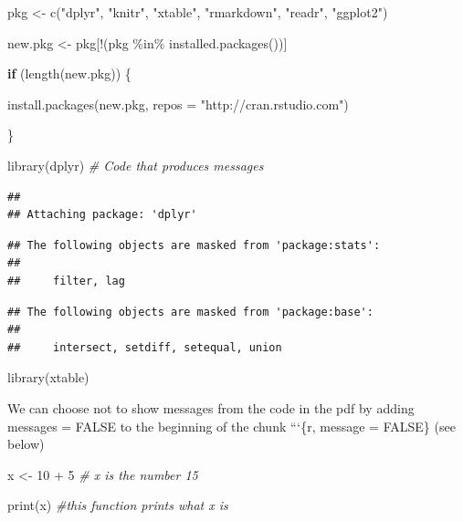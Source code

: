 \documentclass[
]{article}
\newenvironment{Shaded}{\begin{snugshade}}{\end{snugshade}}
\newcommand{\AttributeTok}[1]{\textcolor[rgb]{0.77,0.63,0.00}{#1}}
\newcommand{\CommentTok}[1]{\textcolor[rgb]{0.56,0.35,0.01}{\textit{#1}}}
\newcommand{\ControlFlowTok}[1]{\textcolor[rgb]{0.13,0.29,0.53}{\textbf{#1}}}
\newcommand{\DecValTok}[1]{\textcolor[rgb]{0.00,0.00,0.81}{#1}}
\newcommand{\FunctionTok}[1]{\textcolor[rgb]{0.00,0.00,0.00}{#1}}
\newcommand{\NormalTok}[1]{#1}
\newcommand{\OtherTok}[1]{\textcolor[rgb]{0.56,0.35,0.01}{#1}}
\newcommand{\SpecialCharTok}[1]{\textcolor[rgb]{0.00,0.00,0.00}{#1}}
\newcommand{\StringTok}[1]{\textcolor[rgb]{0.31,0.60,0.02}{#1}}
\begin{document}
\begin{Shaded}
\begin{Highlighting}[]
\NormalTok{pkg }\OtherTok{\textless{}{-}} \FunctionTok{c}\NormalTok{(}\StringTok{"dplyr"}\NormalTok{, }\StringTok{"knitr"}\NormalTok{, }\StringTok{"xtable"}\NormalTok{, }\StringTok{"rmarkdown"}\NormalTok{, }\StringTok{"readr"}\NormalTok{, }\StringTok{"ggplot2"}\NormalTok{)}

\NormalTok{new.pkg }\OtherTok{\textless{}{-}}\NormalTok{ pkg[}\SpecialCharTok{!}\NormalTok{(pkg }\SpecialCharTok{\%in\%} \FunctionTok{installed.packages}\NormalTok{())]}

\ControlFlowTok{if}\NormalTok{ (}\FunctionTok{length}\NormalTok{(new.pkg)) \{}

  \FunctionTok{install.packages}\NormalTok{(new.pkg, }\AttributeTok{repos =} \StringTok{"http://cran.rstudio.com"}\NormalTok{)}
  
\NormalTok{\}}

\FunctionTok{library}\NormalTok{(dplyr) }\CommentTok{\# Code that produces messages}
\end{Highlighting}
\end{Shaded}

\begin{verbatim}
## 
## Attaching package: 'dplyr'
\end{verbatim}

\begin{verbatim}
## The following objects are masked from 'package:stats':
## 
##     filter, lag
\end{verbatim}

\begin{verbatim}
## The following objects are masked from 'package:base':
## 
##     intersect, setdiff, setequal, union
\end{verbatim}

\begin{Shaded}
\begin{Highlighting}[]
\FunctionTok{library}\NormalTok{(xtable)}
\end{Highlighting}
\end{Shaded}

We can choose not to show messages from the code in the pdf by adding
messages = FALSE to the beginning of the chunk ```\{r, message = FALSE\}
(see below)

\begin{Shaded}
\begin{Highlighting}[]
\NormalTok{x }\OtherTok{\textless{}{-}} \DecValTok{10} \SpecialCharTok{+} \DecValTok{5} \CommentTok{\# x is the number 15}

\FunctionTok{print}\NormalTok{(x) }\CommentTok{\#this function prints what x is}
\end{Highlighting}
\end{Shaded}
\end{document}
